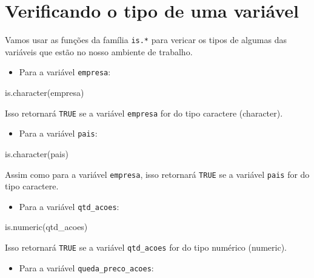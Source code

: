 \documentclass[
  portuguese,
  letterpaper,
  DIV=11,
  numbers=noendperiod]{scrreprt}
\newenvironment{Shaded}{\begin{snugshade}}{\end{snugshade}}
\newcommand{\FunctionTok}[1]{\textcolor[rgb]{0.28,0.35,0.67}{#1}}
\newcommand{\NormalTok}[1]{\textcolor[rgb]{0.00,0.23,0.31}{#1}}
\providecommand{\tightlist}{%
  \setlength{\itemsep}{0pt}\setlength{\parskip}{0pt}}
\theoremstyle{definition}
\theoremstyle{remark}
\begin{document}
\section{Verificando o tipo de uma
variável}\label{verificando-o-tipo-de-uma-variuxe1vel}

Vamos usar as funções da família \texttt{is.*} para vericar os tipos de
algumas das variáveis que estão no nosso ambiente de trabalho.

\begin{itemize}
\tightlist
\item
  Para a variável \texttt{empresa}:
\end{itemize}

\begin{Shaded}
\begin{Highlighting}[]
\FunctionTok{is.character}\NormalTok{(empresa)}
\end{Highlighting}
\end{Shaded}

Isso retornará \texttt{TRUE} se a variável \texttt{empresa} for do tipo
caractere (character).

\begin{itemize}
\tightlist
\item
  Para a variável \texttt{pais}:
\end{itemize}

\begin{Shaded}
\begin{Highlighting}[]
\FunctionTok{is.character}\NormalTok{(pais)}
\end{Highlighting}
\end{Shaded}

Assim como para a variável \texttt{empresa}, isso retornará
\texttt{TRUE} se a variável \texttt{pais} for do tipo caractere.

\begin{itemize}
\tightlist
\item
  Para a variável \texttt{qtd\_acoes}:
\end{itemize}

\begin{Shaded}
\begin{Highlighting}[]
\FunctionTok{is.numeric}\NormalTok{(qtd\_acoes)}
\end{Highlighting}
\end{Shaded}

Isso retornará \texttt{TRUE} se a variável \texttt{qtd\_acoes} for do
tipo numérico (numeric).

\begin{itemize}
\tightlist
\item
  Para a variável \texttt{queda\_preco\_acoes}:
\end{itemize}
\end{document}
